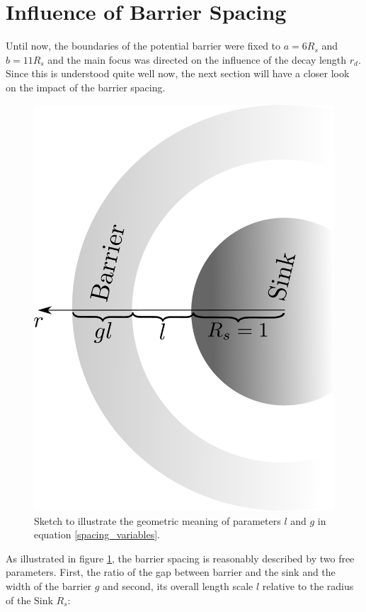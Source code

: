 \section{Influence of Barrier Spacing}
\label{barrier_spacing}
Until now, the boundaries of the potential barrier were fixed to $a=6 R_s$ and $b=11R_s$ and the main focus was directed on the influence of the decay length $r_d$. Since this is understood quite well now, the next section will have a closer look on the impact of the barrier spacing.\par
\begin{figure}
        \includegraphics[width = 1 \textwidth]{plots/lgdef.pdf}
        \caption{Sketch to illustrate the geometric meaning of parameters $l$ and $g$ in equation \eqref{spacing_variables}.}
        \label{fig:lgdef_skizze}
\end{figure}
As illustrated in figure \ref{fig:lgdef_skizze}, the barrier spacing is reasonably described by two free parameters. First, the ratio of the gap between barrier and the sink and the width of the barrier $g$ and second, its overall length scale $l$ relative to the radius of the Sink $R_s$:
